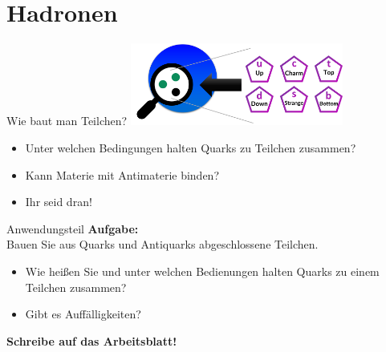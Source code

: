 \section{Hadronen}

\begin{frame}{Wie baut man Teilchen?}
    \centering
    \includegraphics[width=7cm]{Figures Lecture on Hadrons/Scale Atom_Quark_downup-approach_Hadron.png}
\begin{itemize}
    \item Unter welchen Bedingungen halten Quarks zu Teilchen zusammen?
    \item Kann Materie mit Antimaterie binden? \pause
    \item[\ding{43}] Ihr seid dran!
\end{itemize}
\end{frame}

\newcommand\squareF{\raisebox{-2mm}{\scalebox{3}{\ding{110}}}}
\begin{frame}{Anwendungsteil}
\textbf{Aufgabe:}\\ Bauen Sie aus Quarks  und Antiquarks abgeschlossene Teilchen. \\ \begin{itemize}
    \item []Wie heißen Sie und unter welchen Bedienungen halten Quarks zu einem Teilchen zusammen?
    \item[] Gibt es Auffälligkeiten? \pause
    \end{itemize}
\vspace{1cm}
\textbf{Schreibe auf das Arbeitsblatt!}
\end{frame}
